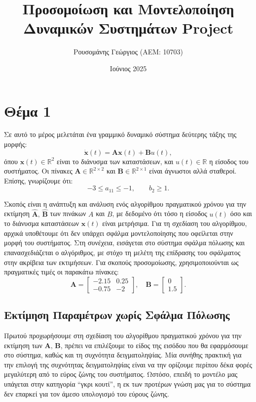 \documentclass[a4paper,12pt]{article}
\title{Προσομοίωση και Μοντελοποίηση \newline Δυναμικών Συστημάτων \newline 
\selectlanguage{english}Project\selectlanguage{greek}}
\author{Ρουσομάνης Γεώργιος (ΑΕΜ: 10703)}
\date{Ιούνιος 2025}
\begin{document}
\maketitle

\section*{Θέμα 1}

Σε αυτό το μέρος μελετάται ένα γραμμικό δυναμικό σύστημα δεύτερης τάξης της μορφής:
\begin{equation}
\dot{\mathbf{x}}(t) = \mathbf{A} \mathbf{x}(t) + \mathbf{B} u(t),
\label{eq:state_space_form}
\end{equation}
όπου $\mathbf{x}(t) \in \mathbb{R}^2$ είναι το διάνυσμα των καταστάσεων, και $u(t) \in \mathbb{R}$ 
η είσοδος του συστήματος. Οι πίνακες $\mathbf{A} \in \mathbb{R}^{2 \times 2}$ και 
$\mathbf{B} \in \mathbb{R}^{2 \times 1}$ είναι άγνωστοι αλλά σταθεροί. Επίσης, γνωρίζουμε ότι:
\begin{equation}
-3 \leq a_{11} \leq -1, \quad \quad b_2 \geq 1.
\label{eq:restrictions}
\end{equation}

Σκοπός είναι η ανάπτυξη και ανάλυση ενός αλγορίθμου πραγματικού χρόνου για την εκτίμηση  
$\hat{\mathbf{A}},\,\hat{\mathbf{B}}$ των πινάκων $A$ και $B$, με δεδομένο ότι τόσο η είσοδος 
$u(t)$ όσο και το διάνυσμα καταστάσεων $\mathbf{x}(t)$ είναι μετρήσιμα. Για τη σχεδίαση του 
αλγορίθμου, αρχικά υποθέτουμε ότι δεν υπάρχει σφάλμα μοντελοποίησης που οφείλεται στην μορφή του 
συστήματος. Στη συνέχεια, εισάγεται στο σύστημα σφάλμα πόλωσης και επανασχεδιάζεται ο αλγόριθμος, 
με στόχο τη μελέτη της επίδρασης του σφάλματος στην ακρίβεια των εκτιμήσεων. Για σκοπούς 
προσομοίωσης, χρησιμοποιούνται ως πραγματικές τιμές οι παρακάτω πίνακες:
\[
\mathbf{A} = 
\begin{bmatrix}
-2.15 & 0.25 \\
-0.75 & -2
\end{bmatrix}, \quad
\mathbf{B} = 
\begin{bmatrix}
0 \\
1.5
\end{bmatrix}.
\]

\subsection*{Εκτίμηση Παραμέτρων χωρίς Σφάλμα Πόλωσης}

Πρωτού προχωρήσουμε στη σχεδίαση του αλγορίθμου πραγματικού χρόνου για την εκτίμηση των 
$\mathbf{A}, \, \mathbf{B}$, πρέπει να επιλέξουμε το είδος της εισόδου που θα εφαρμόσουμε 
στο σύστημα, καθώς και τη συχνότητα δειγματοληψίας. Μία συνήθης πρακτική για την επιλογή της 
συχνότητας δειγματοληψίας είναι να την ορίζουμε περίπου δέκα φορές μεγαλύτερη από το εύρος 
ζώνης του συστήματος. Ωστόσο, επειδή το μοντέλο μας υπάγεται στην κατηγορία ``γκρι κουτί'', 
η εκ των προτέρων γνώση μας για το σύστημα δεν επαρκεί για τον άμεσο υπολογισμό του εύρους ζώνης.
\end{document}

